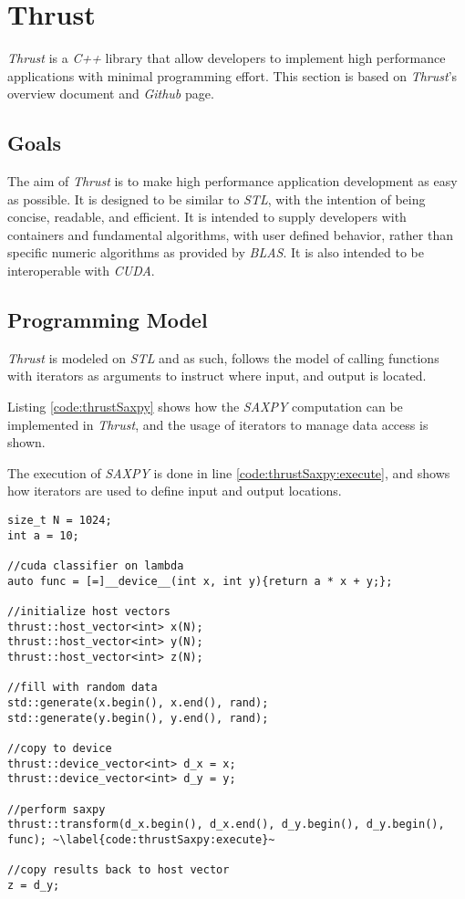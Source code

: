\section{Thrust}
\textit{Thrust} is a \textit{C++} library that allow developers to implement high performance applications with minimal programming effort. This section is based on \textit{Thrust}'s overview document\cite{thrustOverview} and \textit{Github} page\cite{thrustGithub}.

\subsection{Goals}
The aim of \textit{Thrust} is to make high performance application development as easy as possible. It is designed to be similar to \textit{STL}, with the intention of being concise, readable, and efficient. It is intended to supply developers with containers and fundamental algorithms, with user defined behavior, rather than specific numeric algorithms as provided by \textit{BLAS}. It is also intended to be interoperable with \textit{CUDA}.

\subsection{Programming Model}
\textit{Thrust} is modeled on \textit{STL} and as such, follows the model of calling functions with iterators as arguments to instruct where input, and output is located.

Listing \ref{code:thrustSaxpy} shows how the \textit{SAXPY} computation can be implemented in \textit{Thrust}, and the usage of iterators to manage data access is shown.

The execution of \textit{SAXPY} is done in line \ref{code:thrustSaxpy:execute}, and shows how iterators are used to define input and output locations.
\begin{lstlisting}[caption={\textit{Thrust} \textit{SAXPY} example.}, label={code:thrustSaxpy}]
size_t N = 1024;
int a = 10;

//cuda classifier on lambda
auto func = [=]__device__(int x, int y){return a * x + y;};

//initialize host vectors
thrust::host_vector<int> x(N);
thrust::host_vector<int> y(N);
thrust::host_vector<int> z(N);

//fill with random data
std::generate(x.begin(), x.end(), rand);
std::generate(y.begin(), y.end(), rand);

//copy to device
thrust::device_vector<int> d_x = x;
thrust::device_vector<int> d_y = y;

//perform saxpy
thrust::transform(d_x.begin(), d_x.end(), d_y.begin(), d_y.begin(), func); ~\label{code:thrustSaxpy:execute}~

//copy results back to host vector
z = d_y;
\end{lstlisting}


